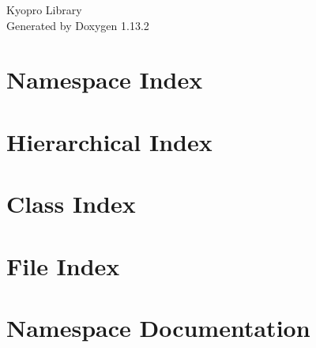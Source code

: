 \documentclass[twoside]{book}
\newcommand{\+}{\discretionary{\mbox{\scriptsize$\hookleftarrow$}}{}{}}
\newcommand{\clearemptydoublepage}{%
    \newpage{\pagestyle{empty}\cleardoublepage}%
  }
\begin{document}
  \raggedbottom
    \hypersetup{pageanchor=false,
                bookmarksnumbered=true,
                pdfencoding=unicode
               }
  \begin{titlepage}
  \vspace*{7cm}
  \begin{center}%
  {\Large Kyopro Library}\\
  \vspace*{1cm}
  {\large Generated by Doxygen 1.13.2}\\
  \end{center}
  \end{titlepage}
  \clearemptydoublepage
  \tableofcontents
  \clearemptydoublepage
  \hypersetup{pageanchor=true}




\chapter{Namespace Index}

\chapter{Hierarchical Index}

\chapter{Class Index}

\chapter{File Index}

\chapter{Namespace Documentation}










\end{document}

